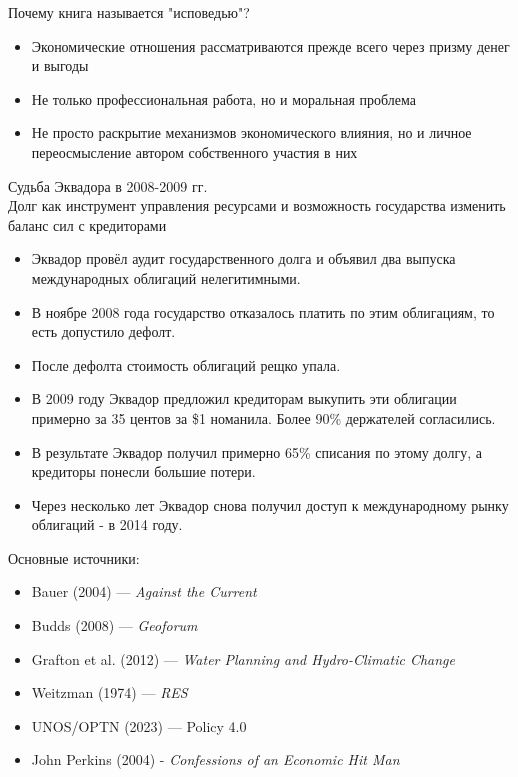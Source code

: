 \documentclass[10pt]{beamer}
\begin{document}
\begin{frame}{Почему книга называется "исповедью"?}
\begin{itemize}
    \item Экономические отношения рассматриваются прежде всего через призму денег и выгоды
    \item Не только профессиональная работа, но и моральная проблема
    \item Не просто раскрытие механизмов экономического влияния, но и личное переосмысление автором собственного участия в них
\end{itemize}
\end{frame}

\begin{frame}{Судьба Эквадора в 2008-2009 гг. \\Долг как инструмент управления ресурсами и возможность государства изменить баланс сил с кредиторами}
\begin{itemize}
  \item Эквадор провёл аудит государственного долга и объявил два выпуска международных облигаций нелегитимными.
  \item В ноябре 2008 года государство отказалось платить по этим облигациям, то есть допустило дефолт.
  \item После дефолта стоимость облигаций рещко упала.
  \item В 2009 году Эквадор предложил кредиторам выкупить эти облигации примерно за 35 центов за \$1 номанила. Более 90\% держателей согласились.
  \item В результате Эквадор получил примерно 65\% списания по этому долгу, а кредиторы понесли большие потери.
  \item Через несколько лет Эквадор снова получил доступ к международному рынку облигаций - в 2014 году.
\end{itemize}

\end{frame}


\begin{frame}{Основные источники:}
\begin{itemize}
      \item Bauer (2004) — \textit{Against the Current}
      \item Budds (2008) — \textit{Geoforum}
      \item Grafton et al. (2012) — \textit{Water Planning and Hydro-Climatic Change}
      \item Weitzman (1974) — \textit{RES}
      \item UNOS/OPTN (2023) — Policy 4.0
      \item John Perkins (2004) - \textit{Confessions of an Economic Hit Man}
\end{itemize}
\end{frame}
\end{document}
